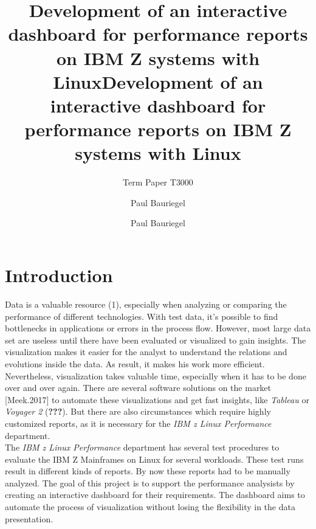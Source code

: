 \documentclass[american,a4paper,oneside,,tablecaptionabove]{scrbook}
\title{Development of an interactive dashboard for performance reports on IBM Z
systems with Linux}
\subtitle{Term Paper T3000}
\author{Paul Bauriegel}
\date{}
\title{Development of an interactive dashboard for performance reports on IBM Z
systems with Linux}
\author{Paul Bauriegel}
\begin{document}

\begin{titlepage}
\afterpage{\restorepagecolor}
\newcommand{\colorRule}[3][black]{\textcolor[HTML]{#1}{\rule{#2}{#3}}}
\end{titlepage}
\restoregeometry



{
\setcounter{tocdepth}{2}
\tableofcontents
}
\chapter{Introduction}\label{introduction}

Data is a valuable resource (1), especially when analyzing or comparing
the performance of different technologies. With test data, it's possible
to find bottlenecks in applications or errors in the process flow.
However, most large data set are useless until there have been evaluated
or visualized to gain insights. The visualization makes it easier for
the analyst to understand the relations and evolutions inside the data.
As result, it makes his work more efficient. Nevertheless, visualization
takes valuable time, especially when it has to be done over and over
again. There are several software solutions on the market
{[}Meek.2017{]} to automate these visualizations and get fast insights,
like \emph{Tableau} or \emph{Voyager 2} ({\textbf{???}}). But there are
also circumstances which require highly customized reports, as it is
necessary for the \emph{IBM z Linux Performance} department.\\
The \emph{IBM z Linux Performance} department has several test
procedures to evaluate the IBM Z Mainframes on Linux for several
workloads. These test runs result in different kinds of reports. By now
these reports had to be manually analyzed. The goal of this project is
to support the performance analysists by creating an interactive
dashboard for their requirements. The dashboard aims to automate the
process of visualization without losing the flexibility in the data
presentation.
\end{document}
